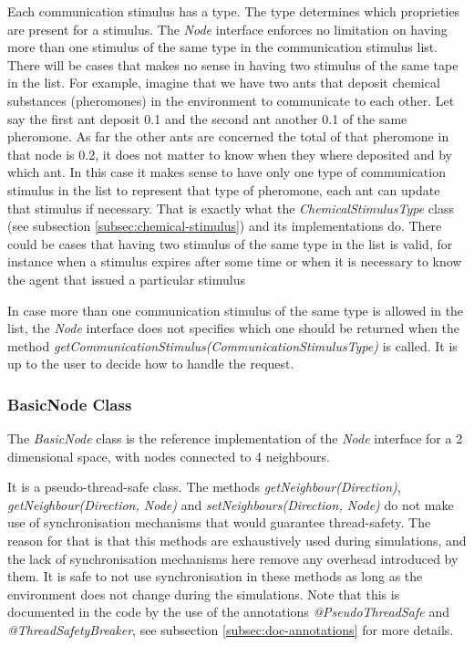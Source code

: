 Each communication stimulus has a type. The type determines which proprieties are present for a stimulus. The \emph{Node} interface enforces no limitation on having more than one stimulus of the same type in the communication stimulus list. There will be cases that makes no sense in having two stimulus of the same tape in the list. For example, imagine that we have two ants that deposit chemical substances (pheromones) in the environment to communicate to each other. Let say the first ant deposit 0.1 and the second ant another 0.1 of the same pheromone. As far the other ants are concerned the total of that pheromone in that node is 0.2, it does not matter to know when they where deposited and by which ant. In this case it makes sense to have only one type of communication stimulus in the list to represent that type of pheromone, each ant can update that stimulus if necessary. That is exactly what the \emph{ChemicalStimulusType} class (see  subsection \ref{subsec:chemical-stimulus}) and its implementations do. There could be cases that having two stimulus of the same type in the list is valid, for instance when a stimulus expires after some time or when it is necessary to know the agent that issued a particular stimulus

In case more than one communication stimulus of the same type is allowed in the list, the \emph{Node} interface does not specifies which one should be returned when the method \emph{getCommunicationStimulus(CommunicationStimulusType)} is called. It is up to the user to decide how to handle the request.

\subsubsection{BasicNode Class}

The \emph{BasicNode} class is the reference implementation of the \emph{Node} interface for a 2 dimensional space, with nodes connected to 4 neighbours.

It is a pseudo-thread-safe class. The methods \emph{getNeighbour(Direction)}, \emph{getNeighbour(Direction, Node)} and \emph{setNeighbours(Direction, Node)} do not make use of synchronisation mechanisms that would guarantee thread-safety. The reason for that is that this methods are exhaustively used during simulations, and the lack of synchronisation mechanisms here remove any overhead introduced by them. It is safe to not use synchronisation in these methods as long as the environment does not change during the simulations. Note that this is documented in the code by the use of the annotations \emph{@PseudoThreadSafe} and \emph{@ThreadSafetyBreaker}, see subsection \ref{subsec:doc-annotations} for more details.

